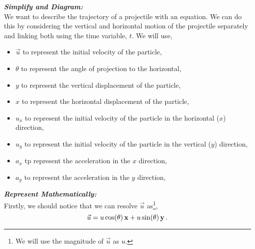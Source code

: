 %
%
%


\begin{subquestions}
	
\subquestion

\textbf{\textit{Simplify and Diagram:}} \\
We want to describe the trajectory of a projectile with an equation. We can do this by considering the vertical and horizontal motion of the projectile separately and linking both using the time variable, $t$. We will use,
\begin{itemize}
	\item $\vec{u}$ to represent the initial velocity of the particle,
	\item $\theta$ to represent the angle of projection to the horizontal,
	\item $y$ to represent the vertical displacement of the particle,
	\item $x$ to represent the horizontal displacement of the particle,
	\item $u_x$ to represent the initial velocity of the particle in the horizontal ($x$) direction,
	\item $u_y$ to represent the initial velocity of the particle in the vertical ($y$) direction,
	\item $a_x$ tp represent the acceleration in the $x$ direction,
	\item $a_y$ to represent the acceleration in the $y$ direction,
\end{itemize}  
	
	
	
	
\textbf{\textit{Represent Mathematically:}} \\
Firstly, we should notice that we can resolve $\vec{u}$ as\footnote{We will use the magnitude of $\vec{u}$ as $u$.},
\begin{equation}
	\vec{u} = u\cos(\theta)\,\mathbf{x} + u\sin(\theta)\,\mathbf{y} \,. \label{2014:q6:Eqn1}
\end{equation}


\end{subquestions}
